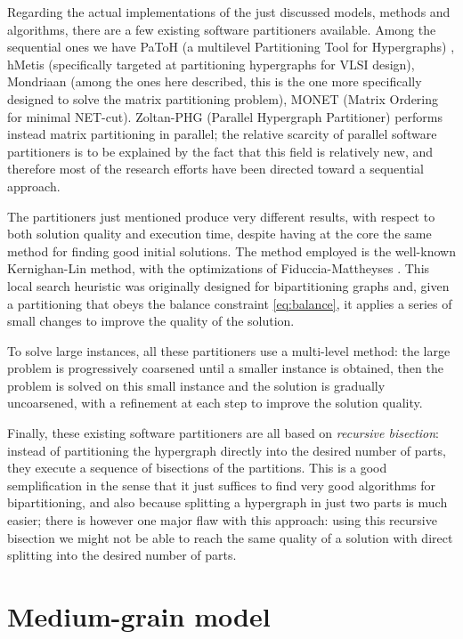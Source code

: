 Regarding the actual implementations of the just discussed models, methods and algorithms, there are a few existing software partitioners available. Among the sequential ones we have PaToH (a multilevel Partitioning Tool for Hypergraphs) \cite{patoh}, hMetis \cite{hmetis} (specifically targeted at partitioning hypergraphs for VLSI design), Mondriaan \cite{mondriaan} (among the ones here described, this is the one more specifically designed to solve the matrix partitioning problem), MONET (Matrix Ordering for minimal NET-cut)\cite{hu2000}. Zoltan-PHG (Parallel Hypergraph Partitioner) \cite{parallel_hypergraph} performs instead matrix partitioning in parallel; the relative scarcity of parallel software partitioners is to be explained by the fact that this field is relatively new, and therefore most of the research efforts have been directed toward a sequential approach.

The partitioners just mentioned produce very different results, with respect to both solution quality and execution time, despite having at the core the same method for finding good initial solutions. The method employed is the well-known Kernighan-Lin \cite{kernighan_lin} method, with the optimizations of Fiduccia-Mattheyses \cite{fiduccia}. This local search heuristic was originally designed for bipartitioning graphs and, given a partitioning that obeys the balance constraint \eqref{eq:balance}, it applies a series of small changes to improve the quality of the solution.

To solve large instances, all these partitioners use a multi-level method: the large problem is progressively coarsened until a smaller instance is obtained, then the problem is solved on this small instance and the solution is gradually uncoarsened, with a refinement at each step to improve the solution quality.

Finally, these existing software partitioners are all based on \emph{recursive bisection}: instead of partitioning the hypergraph directly into the desired number of parts, they execute a sequence of bisections of the partitions. This is a good semplification in the sense that it just suffices to find very good algorithms for bipartitioning, and also because splitting a hypergraph in just two parts is much easier; there is however one major flaw with this approach: using this recursive bisection  we might not be able to reach the same quality of a solution with direct splitting into the desired number of parts.

\section{Medium-grain model} \label{sec:mediumgrain}

